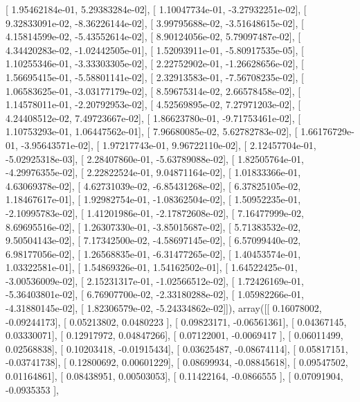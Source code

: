 \documentclass{article}
\begin{document}
       [  1.95462184e-01,   5.29383284e-02],
       [  1.10047734e-01,  -3.27932251e-02],
       [  9.32833091e-02,  -8.36226144e-02],
       [  3.99795688e-02,  -3.51648615e-02],
       [  4.15814599e-02,  -5.43552614e-02],
       [  8.90124056e-02,   5.79097487e-02],
       [  4.34420283e-02,  -1.02442505e-01],
       [  1.52093911e-01,  -5.80917535e-05],
       [  1.10255346e-01,  -3.33303305e-02],
       [  2.22752902e-01,  -1.26628656e-02],
       [  1.56695415e-01,  -5.58801141e-02],
       [  2.32913583e-01,  -7.56708235e-02],
       [  1.06583625e-01,  -3.03177179e-02],
       [  8.59675314e-02,   2.66578458e-02],
       [  1.14578011e-01,  -2.20792953e-02],
       [  4.52569895e-02,   7.27971203e-02],
       [  4.24408512e-02,   7.49723667e-02],
       [  1.86623780e-01,  -9.71753461e-02],
       [  1.10753293e-01,   1.06447562e-01],
       [  7.96680085e-02,   5.62782783e-02],
       [  1.66176729e-01,  -3.95643571e-02],
       [  1.97217743e-01,   9.96722110e-02],
       [  2.12457704e-01,  -5.02925318e-03],
       [  2.28407860e-01,  -5.63789088e-02],
       [  1.82505764e-01,  -4.29976355e-02],
       [  2.22822524e-01,   9.04871164e-02],
       [  1.01833366e-01,   4.63069378e-02],
       [  4.62731039e-02,  -6.85431268e-02],
       [  6.37825105e-02,   1.18467617e-01],
       [  1.92982754e-01,  -1.08362504e-02],
       [  1.50952235e-01,  -2.10995783e-02],
       [  1.41201986e-01,  -2.17872608e-02],
       [  7.16477999e-02,   8.69695516e-02],
       [  1.26307330e-01,  -3.85015687e-02],
       [  5.71383532e-02,   9.50504143e-02],
       [  7.17342500e-02,  -4.58697145e-02],
       [  6.57099440e-02,   6.98177056e-02],
       [  1.26568835e-01,  -6.31477265e-02],
       [  1.40453574e-01,   1.03322581e-01],
       [  1.54869326e-01,   1.54162502e-01],
       [  1.64522425e-01,  -3.00536009e-02],
       [  2.15231317e-01,  -1.02566512e-02],
       [  1.72426169e-01,  -5.36403801e-02],
       [  6.76907700e-02,  -2.33180288e-02],
       [  1.05982266e-01,  -4.31880145e-02],
       [  1.82306579e-02,  -5.24334862e-02]]), array([[ 0.16078002, -0.09244173],
       [ 0.05213802,  0.0480223 ],
       [ 0.09823171, -0.06561361],
       [ 0.04367145,  0.03330071],
       [ 0.12917972,  0.04847266],
       [ 0.07122001, -0.0069417 ],
       [ 0.06011499,  0.02568838],
       [ 0.10203418, -0.01915434],
       [ 0.03625487, -0.08674114],
       [ 0.05817151, -0.03741738],
       [ 0.12800692,  0.00601229],
       [ 0.08699934, -0.08845618],
       [ 0.09547502,  0.01164861],
       [ 0.08438951,  0.00503053],
       [ 0.11422164, -0.0866555 ],
       [ 0.07091904, -0.0935353 ],
\end{document}
